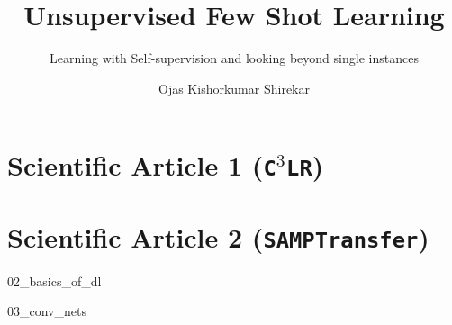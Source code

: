 \documentclass[whitelogo]{TUD-report2020}
\newcommand{\ccclr}{\texttt{C$^3$LR}}
\def\samptr{\texttt{SAMPTransfer}}
\begin{document}
\captionsetup{format=plain, font=small, labelfont=bf, justification=RaggedRight}
\frontmatter


\title[tudelft-white]{Unsupervised Few Shot Learning}
\subtitle[tudelft-white]{Learning with Self-supervision and looking beyond single instances}
\author[tudelft-white]{Ojas Kishorkumar Shirekar}
\makecover[split]






\tableofcontents

\mainmatter


\chapter{Scientific Article 1 (\ccclr)}


\chapter{Scientific Article 2 (\samptr)}

% 

\listofchanges[title=Comments]





% 
{02_basics_of_dl}

{03_conv_nets}









\appendix

%

\printbibliography
\end{document}
